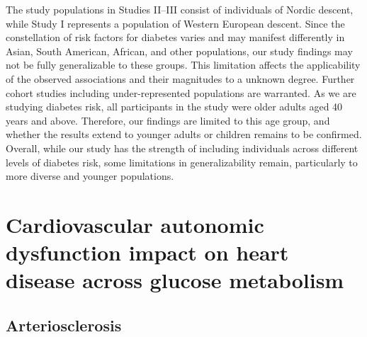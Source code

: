 \documentclass[
  a4paper,
  headsepline=true,
  open=any]{scrbook}
\begin{document}
The study populations in Studies II--III consist of individuals of
Nordic descent, while Study I represents a population of Western
European descent. Since the constellation of risk factors for diabetes
varies and may manifest differently in Asian, South American, African,
and other populations, our study findings may not be fully generalizable
to these groups. This limitation affects the applicability of the
observed associations and their magnitudes to a unknown degree. Further
cohort studies including under-represented populations are warranted. As
we are studying diabetes risk, all participants in the study were older
adults aged 40 years and above. Therefore, our findings are limited to
this age group, and whether the results extend to younger adults or
children remains to be confirmed. Overall, while our study has the
strength of including individuals across different levels of diabetes
risk, some limitations in generalizability remain, particularly to more
diverse and younger populations.

\hypertarget{cardiovascular-autonomic-dysfunction-impact-on-heart-disease-across-glucose-metabolism}{%
\section{Cardiovascular autonomic dysfunction impact on heart disease
across glucose
metabolism}\label{cardiovascular-autonomic-dysfunction-impact-on-heart-disease-across-glucose-metabolism}}

\hypertarget{arteriosclerosis-1}{%
\subsection{Arteriosclerosis}\label{arteriosclerosis-1}}
\end{document}
